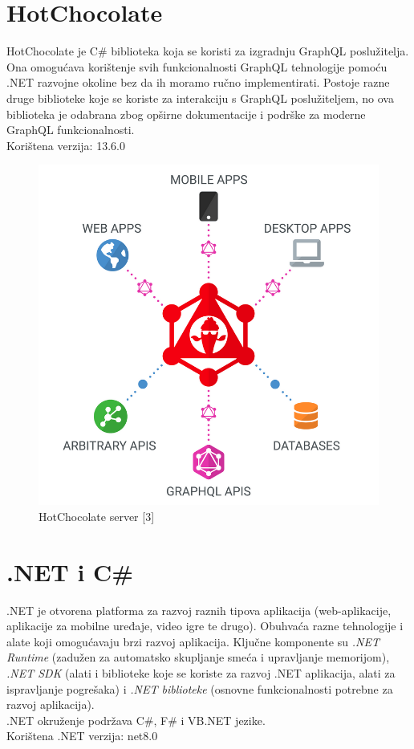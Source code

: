 \documentclass[zavrsnirad]{fer}
\begin{document}
\section{HotChocolate}
\label{pog:hotchocolate}
HotChocolate je C\# biblioteka koja se koristi za izgradnju GraphQL poslužitelja. Ona omogućava korištenje svih funkcionalnosti GraphQL tehnologije pomoću .NET razvojne okoline bez da ih moramo ručno implementirati. Postoje razne druge biblioteke koje se koriste za interakciju s GraphQL poslužiteljem, no ova biblioteka je odabrana zbog opširne dokumentacije i podrške za moderne GraphQL funkcionalnosti.\\Korištena verzija: 13.6.0
\begin{figure}[htb]
	\centering
	\includegraphics[width=0.6\linewidth]{images/hot_chocolate.png} 
	\caption{HotChocolate server [3]}
	\label{slk:hot_chooclate}
\end{figure}
\FloatBarrier

\section{.NET i C\#}
.NET je otvorena platforma za razvoj raznih tipova aplikacija (web-aplikacije, aplikacije za mobilne uređaje, video igre te drugo). Obuhvaća razne tehnologije i alate koji omogućavaju brzi razvoj aplikacija. Ključne komponente su \textit{.NET Runtime} (zadužen za automatsko skupljanje smeća i upravljanje memorijom), \textit{.NET SDK} (alati i biblioteke koje se koriste za razvoj .NET aplikacija, alati za ispravljanje pogrešaka) i \textit{.NET biblioteke} (osnovne funkcionalnosti potrebne za razvoj aplikacija).
\\.NET okruženje podržava C\#, F\# i VB.NET jezike.
\\Korištena .NET verzija: net8.0
\end{document}
